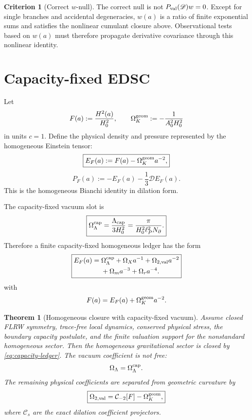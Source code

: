 \documentclass[aps,prd,reprint,nofootinbib,superscriptaddress]{revtex4-2}
\numberwithin{equation}{section}
\theoremstyle{definition}
\newtheorem{criterion}{Criterion}[section]
\theoremstyle{plain}
\newtheorem{theorem}{Theorem}[section]
\newcommand{\Dil}{\mathscr D}
\newcommand{\Ncap}{N_{\partial}}
\begin{document}
\begin{criterion}[Correct \(w\)-null]
The correct null is not \(P_{\rm val}(\Dil)w=0\).  Except for single branches and accidental degeneracies, \(w(a)\) is a ratio of finite exponential sums and satisfies the nonlinear cumulant closure above.  Observational tests based on \(w(a)\) must therefore propagate derivative covariance through this nonlinear identity.
\end{criterion}

\section{Capacity-fixed EDSC}

Let
\begin{equation}
F(a):=\frac{H^2(a)}{H_0^2},
\qquad
\Omega_K^{\rm geom}:=-\frac{1}{A_0^2H_0^2}
\end{equation}
in units \(c=1\).  Define the physical density and pressure represented by the homogeneous Einstein tensor:
\begin{equation}
\boxed{
E_F(a):=F(a)-\Omega_K^{\rm geom}a^{-2},
}
\end{equation}
\begin{equation}
\boxed{
P_F(a):=-E_F(a)-\frac13\Dil E_F(a).
}
\end{equation}
This is the homogeneous Bianchi identity in dilation form.

The capacity-fixed vacuum slot is
\begin{equation}
\boxed{
\Omega_\Lambda^{\rm cap}
=
\frac{\Lambda_{\rm cap}}{3H_0^2}
=
\frac{\pi}{H_0^2\ell_P^2\Ncap}.
}
\end{equation}
Therefore a finite capacity-fixed homogeneous ledger has the form
\begin{equation}
\boxed{\begin{aligned}
E_F(a)
={}&\Omega_\Lambda^{\rm cap}
+\Omega_Xa^{-1}
+\Omega_{2,\rm val}a^{-2}\\
&+\Omega_ma^{-3}
+\Omega_ra^{-4}.
\end{aligned}}
\label{eq:capacity-ledger}
\end{equation}
with
\begin{equation}
F(a)=E_F(a)+\Omega_K^{\rm geom}a^{-2}.
\end{equation}

\begin{theorem}[Homogeneous closure with capacity-fixed vacuum]\label{thm:capacity-edsc}
Assume closed FLRW symmetry, trace-free local dynamics, conserved physical stress, the boundary capacity postulate, and the finite valuation support for the nonstandard homogeneous sector.  Then the homogeneous gravitational sector is closed by \eqref{eq:capacity-ledger}.  The vacuum coefficient is not free:
\[
\Omega_\Lambda=\Omega_\Lambda^{\rm cap}.
\]
The remaining physical coefficients are separated from geometric curvature by
\[
\boxed{
\Omega_{2,\rm val}=\mathcal C_{-2}[F]-\Omega_K^{\rm geom},
}
\]
where \(\mathcal C_s\) are the exact dilation coefficient projectors.
\end{theorem}
\end{document}
